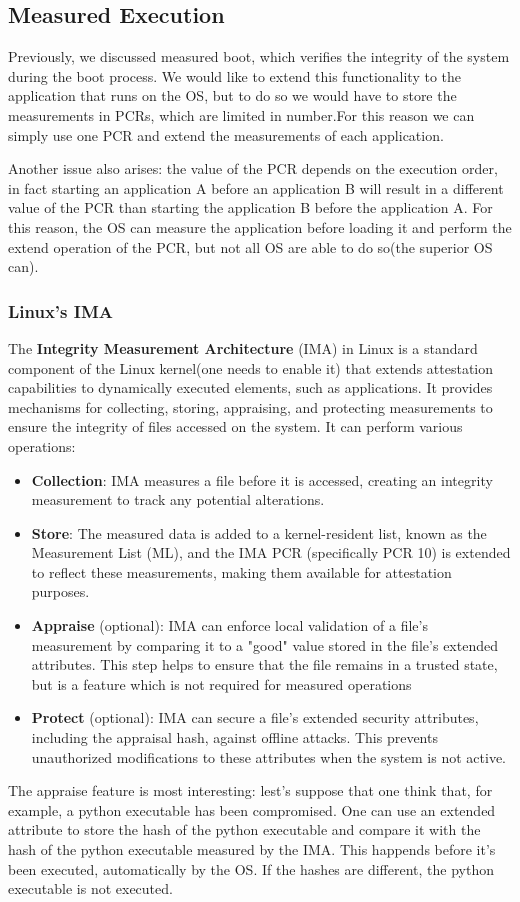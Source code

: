 \subsection{Measured Execution}
Previously, we discussed measured boot, which verifies the integrity 
of the system during the boot process. We would like to extend this
functionality to the application that runs on the OS, but to do so we
would have to store the measurements in PCRs, which are limited in 
number.For this reason we can simply use one PCR and extend the
measurements of each application.

Another issue also arises: the value of the PCR depends on the
execution order, in fact starting an application A before an
application B will result in a different value of the PCR than
starting the application B before the application A.
For this reason, the OS can measure the application before loading it
and perform the extend operation of the PCR, but not all OS are able
to do so(the superior OS can).
\subsubsection{Linux’s IMA}

The \textbf{Integrity Measurement Architecture} (IMA) in Linux is a
standard component of the Linux kernel(one needs to enable it)
that extends attestation capabilities to dynamically executed
elements, such as applications. It provides mechanisms for collecting,
storing, appraising, and protecting measurements to ensure the
integrity of files accessed on the system.
It can perform various operations:

\begin{itemize}
  \item \textbf{Collection}: IMA measures a file before it is
    accessed, creating an integrity measurement to track any potential
    alterations.
  \item \textbf{Store}: The measured data is added to a
    kernel-resident list, known as the Measurement List (ML), and the
    IMA PCR (specifically PCR 10) is extended to reflect these
    measurements, making them available for attestation purposes.
  \item \textbf{Appraise} (optional): IMA can enforce local validation
    of a file's measurement by comparing it to a "good" value stored in
    the file's extended attributes. This step helps to ensure that the
    file remains in a trusted state, but is a feature which
    is not required for measured operations
  \item \textbf{Protect} (optional): IMA can secure a file's extended
    security attributes, including the appraisal hash, against offline
    attacks. This prevents unauthorized modifications to these
    attributes when the system is not active.
\end{itemize}
The appraise feature is most interesting: lest's suppose that one
think that, for example, a python executable has been compromised. One
can use an extended attribute to store the hash of the python 
executable and compare it with the hash of the python executable 
measured by the IMA. This happends before it's been executed,
automatically by the OS. If the hashes are different, the python
executable is not executed.

